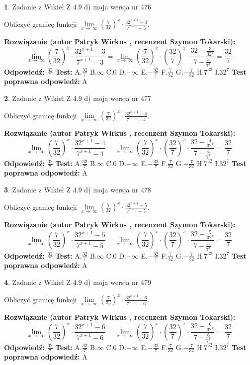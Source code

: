 \documentclass[12pt, a4paper]{article}
\theoremstyle{definition} %
\newtheorem{zad}{}
\newcommand{\zadStart}[1]{\begin{zad}#1\newline}
\newcommand{\zadStop}{\end{zad}}
\newcommand{\rozwStart}[2]{\noindent \textbf{Rozwiązanie (autor #1 , recenzent #2): }\newline}
\newcommand{\rozwStop}{\newline}
\newcommand{\odpStart}{\noindent \textbf{Odpowiedź:}\newline}
\newcommand{\odpStop}{\newline}
\newcommand{\testStart}{\noindent \textbf{Test:}\newline}
\newcommand{\testStop}{\newline}
\newcommand{\kluczStart}{\noindent \textbf{Test poprawna odpowiedź:}\newline}
\newcommand{\kluczStop}{\newline}
\begin{document}
\zadStart{Zadanie z Wikieł Z 4.9 d) moja wersja nr 476}


Obliczyć granicę funkcji  $\lim\limits_{x\to\ \infty}(\frac{7}{32})^{x}\cdot\frac{32^{x+1}-3}{7^{x+1}-3}$.
\zadStop
\rozwStart{Patryk Wirkus}{Szymon Tokarski}
$$\lim\limits_{x\to\ \infty}(\frac{7}{32})^{x}\cdot\frac{32^{x+1}-3}{7^{x+1}-3}=\lim\limits_{x\to\ \infty}(\frac{7}{32})^{x}\cdot(\frac{32}{7})^{x} \cdot \frac{32-\frac{3}{32^{x}}}{7-\frac{3}{7^{x}}} = \frac{32}{7}$$
\rozwStop
\odpStart
$\frac{32}{7}$
\odpStop
\testStart
A.$\frac{32}{7}$ B.$\infty$ C.$0$ D.$-\infty$ E.$-\frac{32}{7}$
F.$\frac{7}{32}$ G.$-\frac{7}{32}$
H.$7^{32}$
I.$32^{7}$
\testStop
\kluczStart
A
\kluczStop



\zadStart{Zadanie z Wikieł Z 4.9 d) moja wersja nr 477}


Obliczyć granicę funkcji  $\lim\limits_{x\to\ \infty}(\frac{7}{32})^{x}\cdot\frac{32^{x+1}-4}{7^{x+1}-4}$.
\zadStop
\rozwStart{Patryk Wirkus}{Szymon Tokarski}
$$\lim\limits_{x\to\ \infty}(\frac{7}{32})^{x}\cdot\frac{32^{x+1}-4}{7^{x+1}-4}=\lim\limits_{x\to\ \infty}(\frac{7}{32})^{x}\cdot(\frac{32}{7})^{x} \cdot \frac{32-\frac{4}{32^{x}}}{7-\frac{4}{7^{x}}} = \frac{32}{7}$$
\rozwStop
\odpStart
$\frac{32}{7}$
\odpStop
\testStart
A.$\frac{32}{7}$ B.$\infty$ C.$0$ D.$-\infty$ E.$-\frac{32}{7}$
F.$\frac{7}{32}$ G.$-\frac{7}{32}$
H.$7^{32}$
I.$32^{7}$
\testStop
\kluczStart
A
\kluczStop



\zadStart{Zadanie z Wikieł Z 4.9 d) moja wersja nr 478}


Obliczyć granicę funkcji  $\lim\limits_{x\to\ \infty}(\frac{7}{32})^{x}\cdot\frac{32^{x+1}-5}{7^{x+1}-5}$.
\zadStop
\rozwStart{Patryk Wirkus}{Szymon Tokarski}
$$\lim\limits_{x\to\ \infty}(\frac{7}{32})^{x}\cdot\frac{32^{x+1}-5}{7^{x+1}-5}=\lim\limits_{x\to\ \infty}(\frac{7}{32})^{x}\cdot(\frac{32}{7})^{x} \cdot \frac{32-\frac{5}{32^{x}}}{7-\frac{5}{7^{x}}} = \frac{32}{7}$$
\rozwStop
\odpStart
$\frac{32}{7}$
\odpStop
\testStart
A.$\frac{32}{7}$ B.$\infty$ C.$0$ D.$-\infty$ E.$-\frac{32}{7}$
F.$\frac{7}{32}$ G.$-\frac{7}{32}$
H.$7^{32}$
I.$32^{7}$
\testStop
\kluczStart
A
\kluczStop



\zadStart{Zadanie z Wikieł Z 4.9 d) moja wersja nr 479}


Obliczyć granicę funkcji  $\lim\limits_{x\to\ \infty}(\frac{7}{32})^{x}\cdot\frac{32^{x+1}-6}{7^{x+1}-6}$.
\zadStop
\rozwStart{Patryk Wirkus}{Szymon Tokarski}
$$\lim\limits_{x\to\ \infty}(\frac{7}{32})^{x}\cdot\frac{32^{x+1}-6}{7^{x+1}-6}=\lim\limits_{x\to\ \infty}(\frac{7}{32})^{x}\cdot(\frac{32}{7})^{x} \cdot \frac{32-\frac{6}{32^{x}}}{7-\frac{6}{7^{x}}} = \frac{32}{7}$$
\rozwStop
\odpStart
$\frac{32}{7}$
\odpStop
\testStart
A.$\frac{32}{7}$ B.$\infty$ C.$0$ D.$-\infty$ E.$-\frac{32}{7}$
F.$\frac{7}{32}$ G.$-\frac{7}{32}$
H.$7^{32}$
I.$32^{7}$
\testStop
\kluczStart
A
\kluczStop
\end{document}
